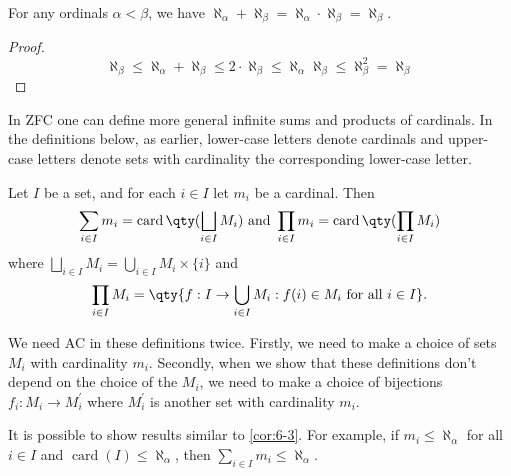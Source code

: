 \begin{corollary} \label{cor:6-3}
    For any ordinals $\alpha < \beta$, we have $\aleph_\alpha + \aleph_\beta = \aleph_\alpha \cdot \aleph_\beta = \aleph_\beta$.
\end{corollary}

\begin{proof}
    \[ \aleph_\beta \leq \aleph_\alpha + \aleph_\beta \leq 2 \cdot \aleph_\beta \leq \aleph_\alpha \aleph_\beta \leq \aleph_\beta^2 = \aleph_\beta \]
\end{proof}

\begin{note}
    In ZFC one can define more general infinite sums and products of cardinals. In the definitions below, as earlier, lower-case letters denote cardinals and upper-case letters denote sets with cardinality the corresponding lower-case letter.
\end{note}

\begin{definition}
    Let $I$ be a set, and for each $i \in I$ let $m_i$ be a cardinal. Then
    \begin{align*}
        \sum_{i \in I} m_i=\operatorname{card}\qty(\bigsqcup_{i \in I} M_i) \text { and } \prod_{i \in I} m_i=\operatorname{card}\qty(\prod_{i \in I} M_i)
    \end{align*}
    where $\bigsqcup_{i \in I} M_i=\bigcup_{i \in I} M_i \times\{i\}$ and
    \begin{align*}
        \prod_{i \in I} M_i=\qty{f: I \rightarrow \bigcup_{i \in I} M_i: f(i) \in M_i \text { for all } i \in I}.
    \end{align*}
\end{definition}

\begin{note}
    We need AC in these definitions twice. Firstly, we need to make a choice of sets $M_i$ with cardinality $m_i$. Secondly, when we show that these definitions don't depend on the choice of the $M_i$, we need to make a choice of bijections $f_i: M_i \rightarrow M_i^{\prime}$ where $M_i^{\prime}$ is another set with cardinality $m_i$.
\end{note}

\begin{example}
    It is possible to show results similar to \cref{cor:6-3}. For example, if $m_i \leqslant \aleph_\alpha$ for all $i \in I$ and $\operatorname{card}(I) \leqslant \aleph_\alpha$, then $\sum_{i \in I} m_i \leqslant \aleph_\alpha$.
\end{example}

